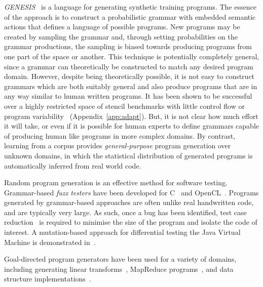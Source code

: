 \emph{GENESIS}~\cite{Chiu2015} is a language for generating synthetic training programs. The essence of the approach is to construct a probabilistic grammar with embedded semantic actions that defines a language of possible programs. New programs may be created by sampling the grammar and, through setting probabilities on the grammar productions, the sampling is biased towards producing programs from one part of the space or another. This technique is potentially completely general, since a grammar can theoretically be constructed to match any desired program domain. However, despite being theoretically possible, it is not easy to construct grammars which are both suitably general and also produce programs that are in any way similar to human written programs. It has been shown to be successful over a highly restricted space of stencil benchmarks with little control flow or program variability~\cite{Garvey2015b,Falch2015} (Appendix~\ref{app:adapt}). But, it is not clear how much effort it will take, or even if it is possible for human experts to define grammars capable of producing human like programs in more complex domains. By contrast, learning from a corpus provides \emph{general-purpose} program generation over unknown domains, in which the statistical distribution of generated programs is automatically inferred from real world code.

Random program generation is an effective method for software testing. Grammar-based \emph{fuzz testers} have been developed for C~\cite{Yang2012} and OpenCL~\cite{Lidbury2015a}. Programs generated by grammar-based approaches are often  unlike real handwritten code, and are typically very large. As such, once a bug has been identified, test case reduction~\cite{Regehr2012a} is required to minimise the size of the program and isolate the code of interest. A mutation-based approach for differential testing the Java Virtual Machine is demonstrated in~\cite{Chena}.

Goal-directed program generators have been used for a variety of domains, including generating linear transforms~\cite{Voronenko2009}, MapReduce programs~\cite{Smith}, and data structure implementations~\cite{Loncaric2016}.


